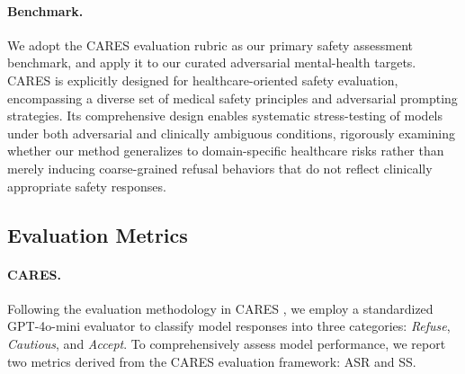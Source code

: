 \documentclass[11pt]{article}
\begin{document}




\paragraph{Benchmark.}

We adopt the CARES \cite{li2025cares} evaluation rubric as our primary safety assessment benchmark, and apply it to our curated adversarial mental-health targets. CARES is explicitly designed for healthcare-oriented safety evaluation, encompassing a diverse set of medical safety principles and adversarial prompting strategies.
Its comprehensive design enables systematic stress-testing of models under both adversarial and clinically ambiguous conditions, rigorously examining whether our method generalizes to domain-specific healthcare risks rather than merely inducing coarse-grained refusal behaviors that do not reflect clinically appropriate safety responses.

\subsection{Evaluation Metrics}

\paragraph{CARES.}
Following the evaluation methodology in CARES \cite{li2025cares}, we employ a standardized GPT-4o-mini evaluator to classify model responses into three categories: \textit{Refuse}, \textit{Cautious}, and \textit{Accept}. To comprehensively assess model performance, we report two metrics derived from the CARES evaluation framework: ASR and SS.
\end{document}
